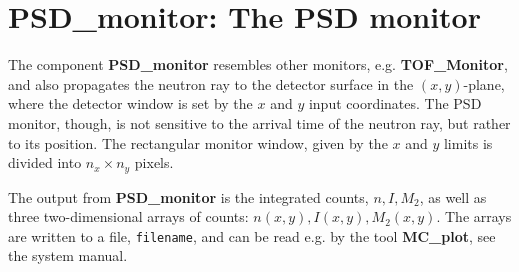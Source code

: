 
\section{PSD\_monitor: The PSD monitor}


The component {\bf PSD\_monitor} resembles other monitors, e.g.
{\bf TOF\_Monitor}, and also propagates the neutron ray to the detector
surface in the $(x,y)$-plane, where the detector window is set
by the $x$ and $y$ input coordinates.
The PSD monitor, though, is not sensitive to the arrival time
of the neutron ray, but rather to its position. 
The rectangular monitor window, given by the $x$ and $y$
limits is divided into $n_x \times n_y$ pixels.

The output from {\bf PSD\_monitor} is the integrated counts, $n, I, M_2$,
as well as
three two-dimensional arrays of counts: $n(x,y), I(x,y), M_2(x,y)$.
The arrays are written to a file, \verb+filename+, and can be read e.g. by the tool
{\bf MC\_plot}, see the system manual.
